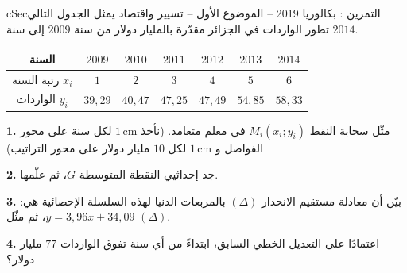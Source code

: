 \documentclass[12pt,a4paper]{article}
\newenvironment{BOX}[2]{\begin{otherlanguage}{english}\begin{arbox}{#1}{#2}}{\end{arbox}\end{otherlanguage}}
\newcounter{exo}
\newenvironment{tamrin}[1]{\stepcounter{exo}\begin{BOX}{cSec}{التمرين \theexo: #1}}{\end{BOX}}
\newcommand{\QQ}[1]{\par\smallskip\textbf{#1.} }
\begin{document}
\begin{tamrin}{بكالوريا 2019 -- الموضوع الأول -- تسيير واقتصاد}
يمثل الجدول التالي تطور الواردات في الجزائر مقدّرة بالمليار دولار من سنة $2009$ إلى سنة $2014$.
\begin{center}
\begin{tabular}{|C|c|c|c|c|c|c|}\hline
{} السنة & $2009$ & $2010$ & $2011$ & $2012$ & $2013$ & $2014$\\\hline
رتبة السنة $x_i$ & $1$ & $2$ & $3$ & $4$ & $5$ & $6$\\\hline
الواردات $y_i$ & $39{,}29$ & $40{,}47$ & $47{,}25$ & $47{,}49$ & $54{,}85$ & $58{,}33$\\\hline
\end{tabular}
\end{center}

\QQ{1} مثّل سحابة النقط $M_i(x_i;y_i)$ في معلم متعامد. (نأخذ $1\,\text{cm}$ لكل سنة على محور الفواصل و $1\,\text{cm}$ لكل $10$ مليار دولار على محور التراتيب)
\QQ{2} جد إحداثيي النقطة المتوسطة $G$، ثم علّمها.
\QQ{3} بيّن أن معادلة مستقيم الانحدار $(\Delta)$ بالمربعات الدنيا لهذه السلسلة الإحصائية هي: $y=3{,}96x+34{,}09$، ثم مثّل $(\Delta)$.
\QQ{4} اعتمادًا على التعديل الخطي السابق، ابتداءً من أي سنة تفوق الواردات $77$ مليار دولار؟
\end{tamrin}
\Needspace{12.5cm}
\end{document}

